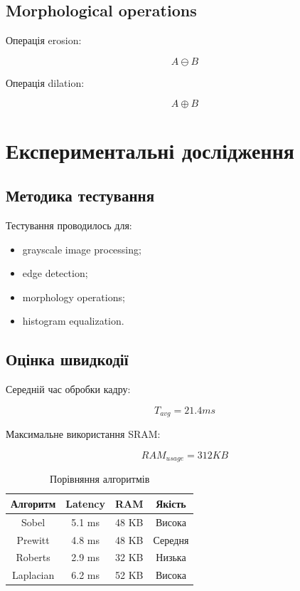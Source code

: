 \documentclass[14pt,a4paper]{extreport}
\begin{document}
\section{Morphological operations}

Операція erosion:

\[
A \ominus B
\]

Операція dilation:

\[
A \oplus B
\]


\chapter{Експериментальні дослідження}

\section{Методика тестування}

Тестування проводилось для:
\begin{itemize}
    \item grayscale image processing;
    \item edge detection;
    \item morphology operations;
    \item histogram equalization.
\end{itemize}

\section{Оцінка швидкодії}

Середній час обробки кадру:

\[
T_{avg} = 21.4 ms
\]

Максимальне використання SRAM:

\[
RAM_{usage} = 312 KB
\]

\begin{table}[H]
\centering
\caption{Порівняння алгоритмів}
\begin{tabular}{|c|c|c|c|}
\hline
Алгоритм & Latency & RAM & Якість \\
\hline
Sobel & 5.1 ms & 48 KB & Висока \\
Prewitt & 4.8 ms & 48 KB & Середня \\
Roberts & 2.9 ms & 32 KB & Низька \\
Laplacian & 6.2 ms & 52 KB & Висока \\
\hline
\end{tabular}
\end{table}
\end{document}
